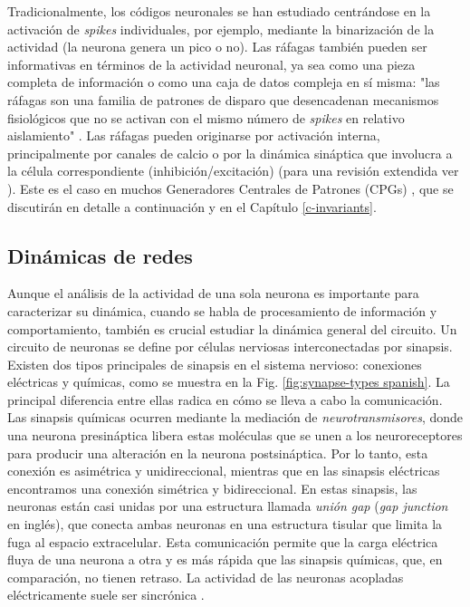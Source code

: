 Tradicionalmente, los códigos neuronales se han estudiado centrándose en la activación de \textit{spikes} individuales, por ejemplo, mediante la binarización de la actividad (la neurona genera un pico o no). Las ráfagas también pueden ser informativas en términos de la actividad neuronal, ya sea como una pieza completa de información o como una caja de datos compleja en sí misma: "las ráfagas son una familia de patrones de disparo que desencadenan mecanismos fisiológicos que no se activan con el mismo número de \textit{spikes} en relativo aislamiento" \parencite{friedenberger_silences_2023}. Las ráfagas pueden originarse por activación interna, principalmente por canales de calcio o por la dinámica sináptica que involucra a la célula correspondiente (inhibición/excitación) (para una revisión extendida ver \parencite{friedenberger_silences_2023}). Este es el caso en muchos Generadores Centrales de Patrones (CPGs) \parencite{Katz,steuer_central_2018}, que se discutirán en detalle a continuación y en el Capítulo \ref{c-invariants}.

\subsection{Dinámicas de redes}

Aunque el análisis de la actividad de una sola neurona es importante para caracterizar su dinámica, cuando se habla de procesamiento de información y comportamiento, también es crucial estudiar la dinámica general del circuito. Un circuito de neuronas se define por células nerviosas interconectadas por sinapsis. Existen dos tipos principales de sinapsis en el sistema nervioso: conexiones eléctricas y químicas, como se muestra en la Fig. \ref{fig:synapse-types spanish}. La principal diferencia entre ellas radica en cómo se lleva a cabo la comunicación. Las sinapsis químicas ocurren mediante la mediación de \textit{neurotransmisores}, donde una neurona presináptica libera estas moléculas que se unen a los neuroreceptores para producir una alteración en la neurona postsináptica. Por lo tanto, esta conexión es asimétrica y unidireccional, mientras que en las sinapsis eléctricas encontramos una conexión simétrica y bidireccional. En estas sinapsis, las neuronas están casi unidas por una estructura llamada \textit{unión gap} (\textit{gap junction} en inglés), que conecta ambas neuronas en una estructura tisular que limita la fuga al espacio extracelular. Esta comunicación permite que la carga eléctrica fluya de una neurona a otra y es más rápida que las sinapsis químicas, que, en comparación, no tienen retraso. La actividad de las neuronas acopladas eléctricamente suele ser sincrónica \parencite{levitan_neuron_2002}.

